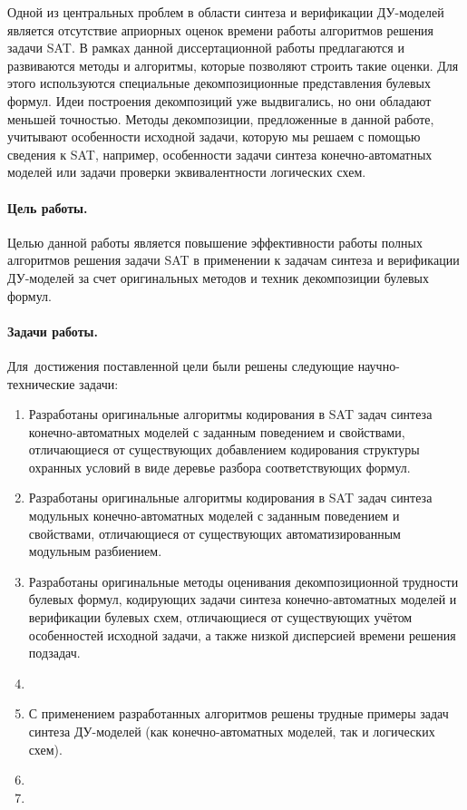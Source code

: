 Одной из центральных проблем в области синтеза и верификации ДУ-моделей является отсутствие априорных оценок времени работы алгоритмов решения задачи SAT.
В рамках данной диссертационной работы предлагаются и развиваются методы и алгоритмы, которые позволяют строить такие оценки.
Для этого используются специальные декомпозиционные представления булевых формул.
Идеи построения декомпозиций уже выдвигались, но они обладают меньшей точностью.
Методы декомпозиции, предложенные в данной работе, учитывают особенности исходной задачи, которую мы решаем с помощью сведения к SAT, например, особенности задачи синтеза конечно-автоматных моделей или задачи проверки эквивалентности логических схем.


\paragraph*{Цель работы.}
%
Целью данной работы является повышение эффективности работы полных алгоритмов решения задачи SAT в применении к задачам синтеза и верификации ДУ-моделей за счет оригинальных методов и техник декомпозиции булевых формул.


\paragraph*{Задачи работы.}
%
Для~достижения поставленной цели были решены следующие научно-технические задачи:
\begin{enumerate}[beginpenalty=10000]
    \item Разработаны оригинальные алгоритмы кодирования в SAT задач синтеза конечно-автоматных моделей с заданным поведением и свойствами, отличающиеся от существующих добавлением кодирования структуры охранных условий в виде деревье разбора соответствующих формул.
    \item Разработаны оригинальные алгоритмы кодирования в SAT задач синтеза модульных конечно-автоматных моделей с заданным поведением и свойствами, отличающиеся от существующих автоматизированным модульным разбиением.
    \item Разработаны оригинальные методы оценивания декомпозиционной трудности булевых формул, кодирующих задачи синтеза конечно-автоматных моделей и верификации булевых схем, отличающиеся от существующих учётом особенностей исходной задачи, а также низкой дисперсией времени решения подзадач.
    \item {}
    \item С применением разработанных алгоритмов решены трудные примеры задач синтеза ДУ-моделей (как конечно-автоматных моделей, так и логических схем).
    \item {}
    \item {}
\end{enumerate}


